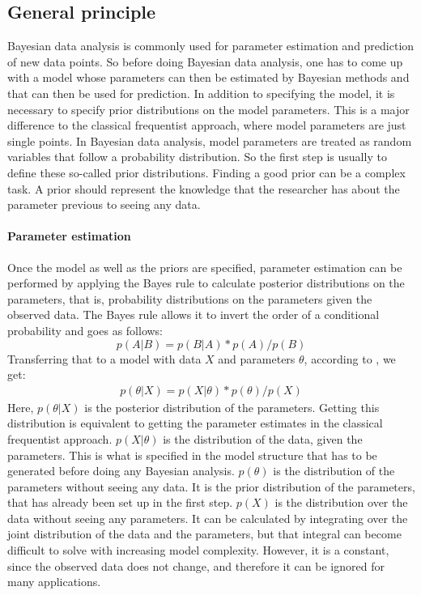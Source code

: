 \documentclass{article}
\begin{document}
\subsection{General principle}
\label{subsec: General principle}
Bayesian data analysis is commonly used for parameter estimation and prediction of new data points. So before doing Bayesian data analysis, one has to come up with a model whose parameters can then be estimated by Bayesian methods and that can then be used for prediction. In addition to specifying the model, it is necessary to specify prior distributions on the model parameters. This is a major difference to the classical frequentist approach, where model parameters are just single points. In Bayesian data analysis, model parameters are treated as random variables that follow a probability distribution. So the first step is usually to define these so-called prior distributions. Finding a good prior can be a complex task. A prior should represent the knowledge that the researcher has about the parameter previous to seeing any data.
\paragraph{Parameter estimation}
Once the model as well as the priors are specified, parameter estimation can be performed by applying the Bayes rule to calculate posterior distributions on the parameters, that is, probability distributions on the parameters given the observed data. The Bayes rule allows it to invert the order of a conditional probability and goes as follows:
\begin{equation}
p(A|B) = p(B|A) * p(A)/p(B)
\end{equation}
Transferring that to a model with data $X$ and parameters $\theta$, according to \cite{1439840954}, we get:
\begin{equation}
\begin{split}
p(\theta|X) = p(X|\theta) * p(\theta)/p(X)
\end{split}
\end{equation}
Here, $p(\theta|X)$ is the posterior distribution of the parameters. Getting this distribution is equivalent to getting the parameter estimates in the classical frequentist approach. $p(X|\theta)$ is the distribution of the data, given the parameters. This is what is specified in the model structure that has to be generated before doing any Bayesian analysis. $p(\theta)$ is the distribution of the parameters without seeing any data. It is the prior distribution of the parameters, that has already been set up in the first step. $p(X)$ is the distribution over the data without seeing any parameters. It can be calculated by integrating over the joint distribution of the data and the parameters, but that integral can become difficult to solve with increasing model complexity. However, it is a constant, since the observed data does not change, and therefore it can be ignored for many applications.
\end{document}
